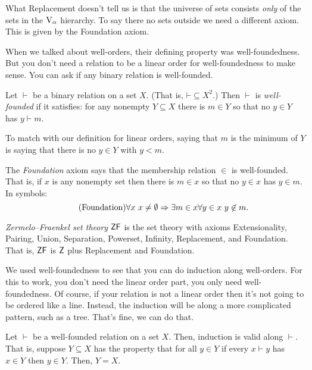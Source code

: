 \documentclass[10pt]{amsart}
\begin{document}
What Replacement doesn't tell us is that the universe of sets consists \emph{only} of the sets in the $\mathrm{V}_\alpha$ hierarchy. To say there no sets outside we need a different axiom. This is given by the Foundation axiom.

When we talked about well-orders, their defining property was well-foundedness. But you don't need a relation to be a linear order for well-foundedness to make sense. You can ask if any binary relation is well-founded.

\begin{definition}
Let $\vdash$ be a binary relation on a set $X$. (That is, $\mathord{\vdash} \subseteq X^2$.) Then $\vdash$ is \emph{well-founded} if it satisfies: for any nonempty $Y \subseteq X$ there is $m \in Y$ so that no $y \in Y$ has $y \vdash m$.
\end{definition}

To match with our definition for linear orders, saying that $m$ is the minimum of $Y$ is saying that there is no $y \in Y$ with $y < m$. 

\begin{definition}
The \emph{Foundation} axiom says that the membership relation $\in$ is well-founded. That is, if $x$ is any nonempty set then there is $m \in x$ so that no $y \in x$ has $y \in m$. In symbols:
\[
\tag{Foundation}
\forall x\ x \ne \emptyset \Rightarrow \exists m \in x \forall y \in x\ y \not \in m.
\]
\end{definition}

\begin{definition}
\emph{Zermelo--Fraenkel set theory} $\mathsf{ZF}$ is the set theory with axioms Extensionality, Pairing, Union, Separation, Powerset, Infinity, Replacement, and Foundation. That is, $\mathsf{ZF}$ is $\mathsf{Z}$ plus Replacement and Foundation.
\end{definition}

We used well-foundedness to see that you can do induction along well-orders. For this to work, you don't need the linear order part, you only need well-foundedness. Of course, if your relation is not a linear order then it's not going to be ordered like a line. Instead, the induction will be along a more complicated pattern, such as a tree. That's fine, we can do that.

\begin{theorem}
Let $\vdash$ be a well-founded relation on a set $X$. Then, induction is valid along $\vdash$. That is, suppose $Y \subseteq X$ has the property that for all $y \in Y$ if every $x \vdash y$ has $x \in Y$ then $y \in Y$. Then, $Y = X$.
\end{theorem}
\end{document}
